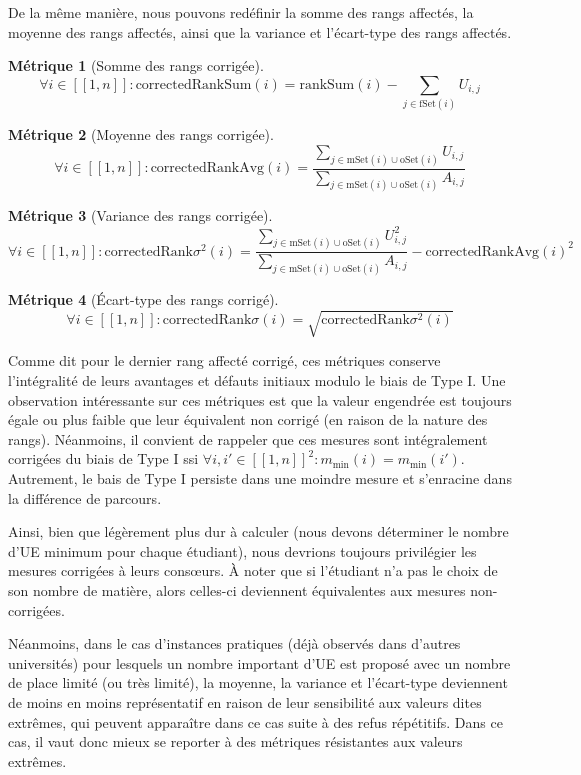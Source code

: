 \documentclass{rapport}
\theoremstyle{definition}
\theoremstyle{remark}
\theoremstyle{definition}
\newtheorem*{metric}{Métrique}
\theoremstyle{remark}
\newcommand{\llbracket}{[\![}
\newcommand{\rrbracket}{]\!]}
\begin{document}
De la même manière, nous pouvons redéfinir la somme des rangs affectés, la moyenne des rangs affectés, ainsi que la variance et l'écart-type des rangs affectés.
\begin{metric}[Somme des rangs corrigée]
    $$
        \forall i\in\llbracket 1, n\rrbracket : \text{correctedRankSum}(i) = \text{rankSum}(i)-\sum_{j\in\text{fSet}(i)} U_{i,j}
    $$
\end{metric}
\begin{metric}[Moyenne des rangs corrigée]
    $$
        \forall i\in\llbracket 1, n\rrbracket : \text{correctedRankAvg}(i) = \frac{\sum_{j\in \text{mSet}(i)\cup\text{oSet}(i)} U_{i,j}}{\sum_{j\in \text{mSet}(i)\cup\text{oSet}(i)} A_{i,j}}
    $$
\end{metric}
\begin{metric}[Variance des rangs corrigée]
    $$
        \forall i\in\llbracket 1, n\rrbracket : \text{correctedRank}\sigma^2(i) = \frac{\sum_{j\in \text{mSet}(i)\cup\text{oSet}(i)} U_{i,j}^2}{\sum_{j\in \text{mSet}(i)\cup\text{oSet}(i)} A_{i,j}} - \text{correctedRankAvg}(i)^2
    $$
\end{metric}
\begin{metric}[Écart-type des rangs corrigé]
    $$
        \forall i\in\llbracket 1, n\rrbracket : \text{correctedRank}\sigma(i) = \sqrt{\text{correctedRank}\sigma^2(i)}
    $$
\end{metric}
Comme dit pour le dernier rang affecté corrigé, ces métriques conserve l'intégralité de leurs avantages et défauts initiaux modulo le biais de Type I.
Une observation intéressante sur ces métriques est que la valeur engendrée est toujours égale ou plus faible que leur équivalent non corrigé (en raison de la nature des rangs).
Néanmoins, il convient de rappeler que ces mesures sont intégralement corrigées du biais de Type I ssi $\forall i,i' \in \llbracket 1,n \rrbracket^2 : m_{\min}(i)=m_{\min}(i')$. Autrement,
le bais de Type I persiste dans une moindre mesure et s'enracine dans la différence de parcours.

Ainsi, bien que légèrement plus dur à calculer (nous devons déterminer le nombre d'UE minimum pour chaque étudiant), nous devrions toujours privilégier les mesures corrigées à leurs consœurs.
À noter que si l'étudiant n'a pas le choix de son nombre de matière, alors celles-ci deviennent équivalentes aux mesures non-corrigées.

Néanmoins, dans le cas d'instances pratiques (déjà observés dans d'autres universités) pour lesquels un nombre important d'UE est proposé avec un nombre de place limité (ou très limité), la moyenne, la variance et l'écart-type deviennent de moins en moins représentatif en raison de leur sensibilité aux valeurs dites extrêmes, qui peuvent apparaître dans ce cas suite à des refus répétitifs.
Dans ce cas, il vaut donc mieux se reporter à des métriques résistantes aux valeurs extrêmes.
\end{document}
